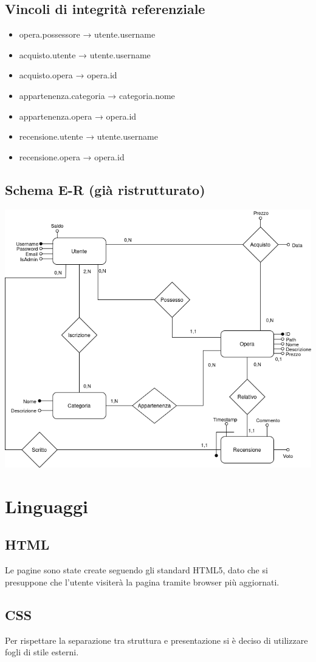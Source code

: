 \documentclass[10pt]{article}
\begin{document}
\subsection{Vincoli di integrità referenziale }
\begin{itemize}
    \item opera.possessore → utente.username
    \item acquisto.utente → utente.username
    \item acquisto.opera → opera.id
    \item appartenenza.categoria → categoria.nome
    \item appartenenza.opera → opera.id
    \item recensione.utente → utente.username
    \item recensione.opera → opera.id
\end{itemize}
\subsection{Schema E-R (già ristrutturato)}
\begin{center}
    \includegraphics[width=0.6\linewidth]{schema_ristrutturato.png}
\end{center}

\section{Linguaggi}
\subsection{HTML}
Le pagine sono state create seguendo gli standard HTML5, dato che si presuppone che l'utente visiterà la pagina tramite browser più aggiornati.
\subsection{CSS}
Per rispettare la separazione tra struttura e presentazione si è deciso di utilizzare fogli di stile esterni.
\end{document}
